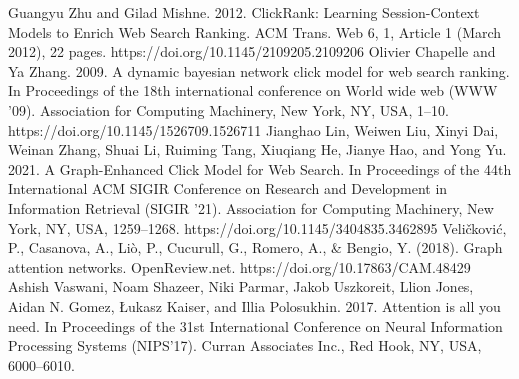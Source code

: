 \documentclass[diploma]{nanolab2015}
\begin{document}
\begin{thebibliography}{00}
    Guangyu Zhu and Gilad Mishne. 2012. ClickRank: Learning Session-Context Models to Enrich Web Search Ranking. ACM Trans. Web 6, 1, Article 1 (March 2012), 22 pages. https://doi.org/10.1145/2109205.2109206
    Olivier Chapelle and Ya Zhang. 2009. A dynamic bayesian network click model for web search ranking. In Proceedings of the 18th international conference on World wide web (WWW '09). Association for Computing Machinery, New York, NY, USA, 1–10. https://doi.org/10.1145/1526709.1526711
    Jianghao Lin, Weiwen Liu, Xinyi Dai, Weinan Zhang, Shuai Li, Ruiming Tang, Xiuqiang He, Jianye Hao, and Yong Yu. 2021. A Graph-Enhanced Click Model for Web Search. In Proceedings of the 44th International ACM SIGIR Conference on Research and Development in Information Retrieval (SIGIR '21). Association for Computing Machinery, New York, NY, USA, 1259–1268. https://doi.org/10.1145/3404835.3462895
    Veličković, P., Casanova, A., Liò, P., Cucurull, G., Romero, A., \& Bengio, Y. (2018). Graph attention networks. OpenReview.net. https://doi.org/10.17863/CAM.48429
    Ashish Vaswani, Noam Shazeer, Niki Parmar, Jakob Uszkoreit, Llion Jones, Aidan N. Gomez, Łukasz Kaiser, and Illia Polosukhin. 2017. Attention is all you need. In Proceedings of the 31st International Conference on Neural Information Processing Systems (NIPS'17). Curran Associates Inc., Red Hook, NY, USA, 6000–6010.

\end{thebibliography}
\end{document}
